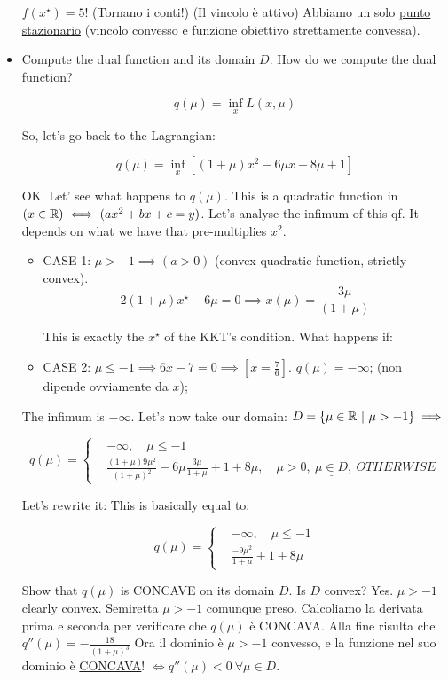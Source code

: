 \begin{itemize}
$f(x^\star) = 5$! (Tornano i conti!) (Il vincolo è attivo) Abbiamo un solo \underline{punto stazionario} (vincolo convesso e funzione obiettivo strettamente convessa).

\item Compute the dual function and its domain $D$. How do we compute the dual function?

\[
	q(\mu) = \inf_x{L(x,\mu)}
\]

So, let's go back to the Lagrangian:

\[
	q(\mu) = \inf_x{[(1+\mu)x^2-6\mu x +8\mu+1]}
\]

OK. Let' see what happens to $q(\mu)$. This is a quadratic function in $(x\in\mathbb{R}) \iff (ax^2+bx+c=y)$. Let's analyse the infimum of this qf. It depends on what we have that pre-multiplies $x^2$. 

\begin{itemize}
\item{CASE 1}: $\mu>-1 \implies (a>0)$ (convex quadratic function, strictly convex).
\[
	2(1+\mu)x^\star -6\mu = 0 \implies x(\mu) = \frac{3\mu}{(1+\mu)}
\]

This is exactly the $x^\star$ of the KKT's condition. What happens if:

\item{CASE 2}: $\mu\leq -1 \implies 6x-7 = 0 \implies [x=\frac{7}{6}]$. $q(\mu)=-\infty$; (non dipende ovviamente da $x$);
\end{itemize}

The infimum is $-\infty$. Let's now take our domain: $D = \{\mu\in\R\ |\ \mu>-1\} \implies$

\[
	q(\mu) =
	\left\{
	\begin{aligned}
	&-\infty,\quad \mu\leq -1\\
	&\frac{(1+\mu)9\mu^2}{(1+\mu)^2} -6\mu\frac{3\mu}{1+\mu} + 1+8\mu,\quad \mu>0,\ \underline{\mu\in D},\ OTHERWISE
	\end{aligned}
	\right.
\]

Let's rewrite it: This is basically equal to:

\[
	q(\mu) =
	\left\{
	\begin{aligned}
	&-\infty,\quad \mu\leq -1\\
	&\frac{-9\mu^2}{1+\mu} + 1+8\mu
	\end{aligned}
	\right.
\]

Show that $q(\mu)$ is CONCAVE on its domain $D$. Is $D$ convex? Yes. $\mu>-1$ clearly convex. Semiretta $\mu>-1$ comunque preso. Calcoliamo la derivata prima e seconda per verificare che $q(\mu)$ è CONCAVA.
Alla fine risulta che $q''(\mu) = -\frac{18}{(1+\mu)^3}$ Ora il dominio è $\mu>-1$ convesso, e la funzione nel suo dominio è \underline{CONCAVA}! $\iff q''(\mu)<0\ \forall\mu\in D$.


\end{itemize}
